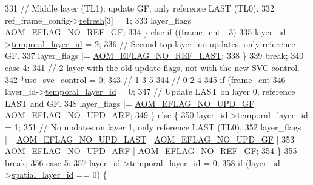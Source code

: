 \begin{DoxyCodeInclude}
{{{{{{{{{331         \textcolor{comment}{// Middle layer (TL1): update GF, only reference LAST (TL0).}
332         ref\_frame\_config->\hyperlink{structaom__svc__ref__frame__config_ab2a4596eadeaf5b7730588367918beda}{refresh}[3] = 1;
333         layer\_flags |= \hyperlink{group__aom__encoder_gaaef6fe76991abf87edd2f296eee999f8}{AOM\_EFLAG\_NO\_REF\_GF};
334       \} \textcolor{keywordflow}{else} \textcolor{keywordflow}{if} ((frame\_cnt - 3) %
335         layer\_id->\hyperlink{structaom__svc__layer__id_a9a28c1b126e8d1fdda6e1d881afb66fb}{temporal\_layer\_id} = 2;
336         \textcolor{comment}{// Second top layer: no updates, only reference GF.}
337         layer\_flags |= \hyperlink{group__aom__encoder_gae272ed6e69ae2a12993565e8176d004b}{AOM\_EFLAG\_NO\_REF\_LAST};
338       \}
339       \textcolor{keywordflow}{break};
340     \textcolor{keywordflow}{case} 4:
341       \textcolor{comment}{// 2-layer with the old update flags, not with the new SVC control.}
342       *use\_svc\_control = 0;
343       \textcolor{comment}{//    1    3    5}
344       \textcolor{comment}{//  0    2    4}
345       \textcolor{keywordflow}{if} (frame\_cnt %
346         layer\_id->\hyperlink{structaom__svc__layer__id_a9a28c1b126e8d1fdda6e1d881afb66fb}{temporal\_layer\_id} = 0;
347         \textcolor{comment}{// Update LAST on layer 0, reference LAST and GF.}
348         layer\_flags |= \hyperlink{group__aom__encoder_gaa81cc31f95fd463f51a158050d267a36}{AOM\_EFLAG\_NO\_UPD\_GF} | 
      \hyperlink{group__aom__encoder_ga469b4cf5ff76cb30de951e129c25a786}{AOM\_EFLAG\_NO\_UPD\_ARF};
349       \} \textcolor{keywordflow}{else} \{
350         layer\_id->\hyperlink{structaom__svc__layer__id_a9a28c1b126e8d1fdda6e1d881afb66fb}{temporal\_layer\_id} = 1;
351         \textcolor{comment}{// No updates on layer 1, only reference LAST (TL0).}
352         layer\_flags |= \hyperlink{group__aom__encoder_ga7a55a46970c074b761319c5c46d87b6e}{AOM\_EFLAG\_NO\_UPD\_LAST} | 
      \hyperlink{group__aom__encoder_gaa81cc31f95fd463f51a158050d267a36}{AOM\_EFLAG\_NO\_UPD\_GF} |
353                        \hyperlink{group__aom__encoder_ga469b4cf5ff76cb30de951e129c25a786}{AOM\_EFLAG\_NO\_UPD\_ARF} | 
      \hyperlink{group__aom__encoder_gaaef6fe76991abf87edd2f296eee999f8}{AOM\_EFLAG\_NO\_REF\_GF};
354       \}
355       \textcolor{keywordflow}{break};
356     \textcolor{keywordflow}{case} 5:
357       layer\_id->\hyperlink{structaom__svc__layer__id_a9a28c1b126e8d1fdda6e1d881afb66fb}{temporal\_layer\_id} = 0;
358       \textcolor{keywordflow}{if} (layer\_id->\hyperlink{structaom__svc__layer__id_af018f2e9cc472827a75b92a78ba6ee4e}{spatial\_layer\_id} == 0) \{
}}}}}}}}}
\end{DoxyCodeInclude}
